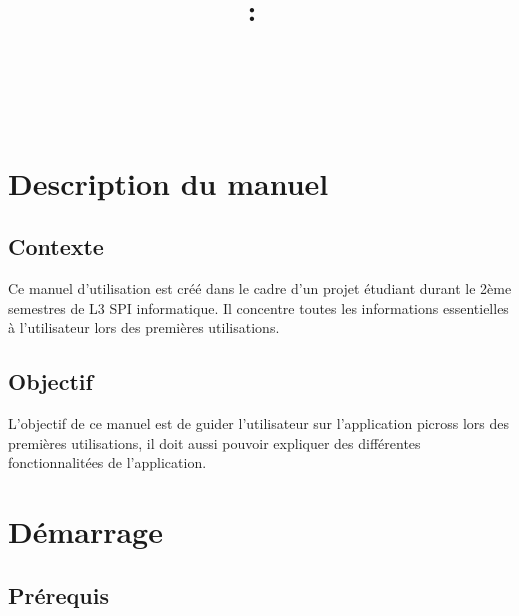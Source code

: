 \documentclass[11pt]{article}
\title{
\pagenumbering{roman} \setcounter{page}{0} %
\vspace{2in}
\textmd{\textbf{\hmwkClass:\ \hmwkTitle}}\\
\normalsize\vspace{0.1in}\small{\hmwkDueDate}\\
\vspace{0.1in}\large{\textit{\hmwkClassInstructor\ }}
\vspace{3in}
}
\author{\textbf{\hmwkAuthorName}}
\date{\hmwkAuthorClasse} %
\begin{document}
\thispagestyle{empty}
\maketitle
\newpage



\thispagestyle{empty}
 \setcounter{page}{0} %
\renewcommand\contentsname{Sommaire}
\tableofcontents
\newpage



\newpage

\section{Description du manuel}

\subsection{Contexte}

Ce manuel d’utilisation est créé dans le cadre d’un projet étudiant durant le 2ème semestres de L3 SPI informatique. Il concentre toutes les informations essentielles à l’utilisateur lors des premières utilisations. 

\subsection{Objectif}

L’objectif de ce manuel est de guider l’utilisateur sur l'application picross lors des premières utilisations, il doit aussi pouvoir expliquer des différentes fonctionnalitées de l'application. 

\section{Démarrage}

\subsection{Prérequis}
\end{document}
